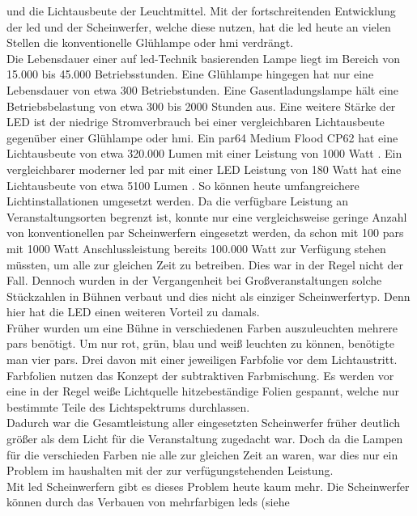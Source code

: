 \documentclass[11pt]{scrartcl}
\begin{document}
und die Lichtausbeute der Leuchtmittel. Mit der fortschreitenden Entwicklung der \ac{led} und der
Scheinwerfer, welche diese nutzen, hat die \ac{led} heute an vielen Stellen die konventionelle Glühlampe oder \ac{hmi} verdrängt.\\
Die Lebensdauer einer auf \ac{led}-Technik basierenden Lampe liegt im Bereich von 15.000 bis 45.000 Betriebsstunden. Eine Glühlampe hingegen
hat nur eine Lebensdauer von etwa 300 Betriebstunden. Eine Gasentladungslampe hält eine Betriebsbelastung von etwa 300 bis 2000 Stunden aus.
Eine weitere Stärke der LED ist der niedrige Stromverbrauch bei einer vergleichbaren Lichtausbeute gegenüber einer Glühlampe oder \ac{hmi}.
Ein \ac{par}64 Medium Flood CP62 hat eine Lichtausbeute von etwa 320.000 Lumen mit einer Leistung von 1000 Watt \cite{convpar}. Ein vergleichbarer %
moderner \ac{led} \ac{par} mit einer LED Leistung von 180 Watt hat eine Lichtausbeute von etwa 5100 Lumen \cite{ledpar}. So können heute umfangreichere
Lichtinstallationen umgesetzt werden. Da die verfügbare Leistung an Veranstaltungsorten begrenzt ist, konnte nur eine vergleichsweise geringe
Anzahl von konventionellen \ac{par} Scheinwerfern eingesetzt werden, da schon mit 100 \ac{par}s mit 1000 Watt Anschlussleistung bereits
100.000 Watt zur Verfügung stehen müssten, um alle zur gleichen Zeit zu betreiben. Dies war in der Regel nicht der Fall. Dennoch wurden in der
Vergangenheit bei Großveranstaltungen solche Stückzahlen in Bühnen verbaut und dies nicht als einziger Scheinwerfertyp.
Denn hier hat die LED einen weiteren Vorteil zu damals.\\
Früher wurden um eine Bühne in verschiedenen Farben auszuleuchten mehrere \ac{par}s benötigt. Um nur rot, grün, blau und weiß leuchten zu
können, benötigte man vier \ac{par}s. Drei davon mit einer jeweiligen Farbfolie vor dem Lichtaustritt. Farbfolien nutzen das Konzept der
subtraktiven Farbmischung. Es werden vor eine in der Regel weiße Lichtquelle hitzebeständige Folien gespannt, welche nur bestimmte Teile des 
Lichtspektrums durchlassen.\\
Dadurch war die Gesamtleistung aller eingesetzten Scheinwerfer früher deutlich größer als dem Licht für die Veranstaltung zugedacht war. Doch
da die Lampen für die verschieden Farben nie alle zur gleichen Zeit an waren, war dies nur ein Problem im haushalten mit der zur verfügungstehenden
Leistung.\\
Mit \ac{led} Scheinwerfern gibt es dieses Problem heute kaum mehr. Die Scheinwerfer können durch das Verbauen von mehrfarbigen \ac{led}s (siehe
\end{document}
